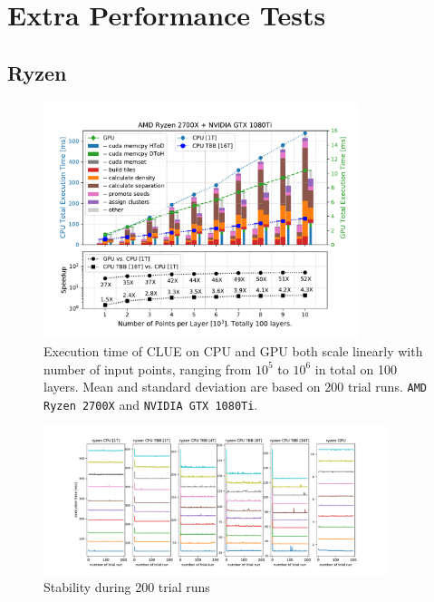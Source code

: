 


\section{Extra Performance Tests}
\label{sec:clue:extraPerfTests}



\subsection{Ryzen}
\begin{figure}[ht!]
    \centering
    \includegraphics[width=0.82\textwidth]{chapters/HGCal/figures/clue/private/Figure5_1.pdf}
    \caption{Execution time of CLUE on CPU and GPU both scale linearly with number of input points, ranging from $10^5$ to $10^6$ in total on 100 layers. Mean and standard deviation are based on 200 trial runs. \texttt{AMD Ryzen 2700X} and \texttt{NVIDIA GTX 1080Ti}.}
\end{figure}
\begin{figure}[ht!]
    \centering
    \includegraphics[trim=3cm 0cm 3cm 0cm, clip,width=0.9\textwidth]{chapters/HGCal/figures/clue/private/addition_ryzen.pdf}
    \caption{Stability during 200 trial runs}
\end{figure}

